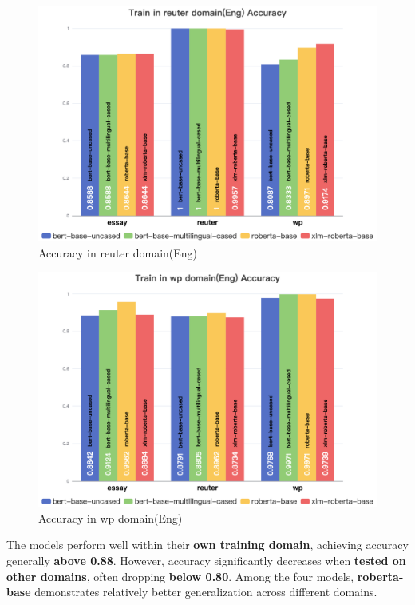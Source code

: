 \documentclass[lettersize,journal]{IEEEtran}
\begin{document}
  \begin{figure}[H]\centering
    \includegraphics[width=0.6\linewidth]{images/Train in reuter domain(Eng) Accuracy.png}
    \caption{Accuracy in reuter domain(Eng)}
    \end{figure} 	

  \begin{figure}[H]\centering
    \includegraphics[width=0.6\linewidth]{images/Train in wp domain(Eng) Accuracy.png}
    \caption{Accuracy in wp domain(Eng)}
    \end{figure} 	

The models perform well within their \textbf{own training domain}, achieving accuracy generally \textbf{above 0.88}. However, accuracy significantly decreases when \textbf{tested on other domains}, often dropping \textbf{below 0.80}. Among the four models, \textbf{roberta-base} demonstrates relatively better generalization across different domains.
\end{document}
